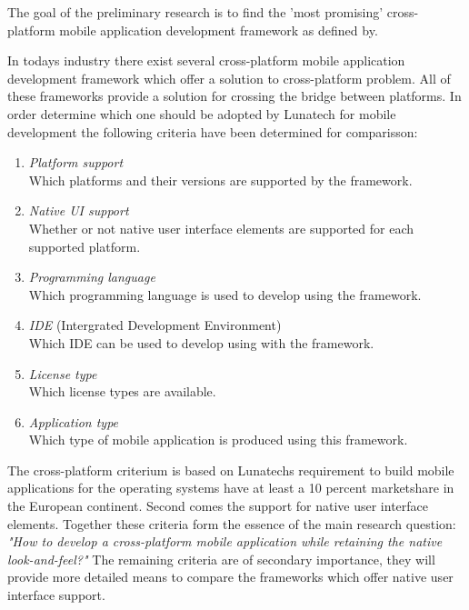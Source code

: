 
The goal of the preliminary research is to find the 'most promising\suitable\mature' cross-platform mobile application development framework as defined by.

In todays industry there exist several cross-platform mobile application development framework which offer a solution to cross-platform problem. All of these frameworks provide a solution for crossing the bridge between platforms. In order determine which one should be adopted by Lunatech for mobile development the following criteria have been determined for comparisson:

\begin{enumerate}
\item \emph{Platform support}\\
Which platforms and their versions are supported by the framework.
\item \emph{Native UI support}\\
Whether or not native user interface elements are supported for each supported platform.
\item \emph{Programming language}\\
Which programming language is used to develop using the framework.
\item \emph{IDE} (Intergrated Development Environment)\\
Which IDE can be used to develop using with the framework.
\item \emph{License type}\\
Which license types are available.
\item \emph{Application type}\\
Which type of mobile application is produced using this framework.
\end{enumerate}

The cross-platform criterium is based on Lunatechs requirement to build mobile applications for the operating systems have at least a 10 percent marketshare in the European continent. Second comes the support for native user interface elements. Together these criteria form the essence of the main research question: \emph{"How to develop a cross-platform mobile application while retaining the native look-and-feel?"}
The remaining criteria are of secondary importance, they will provide more detailed means to compare the frameworks which offer native user interface support.


